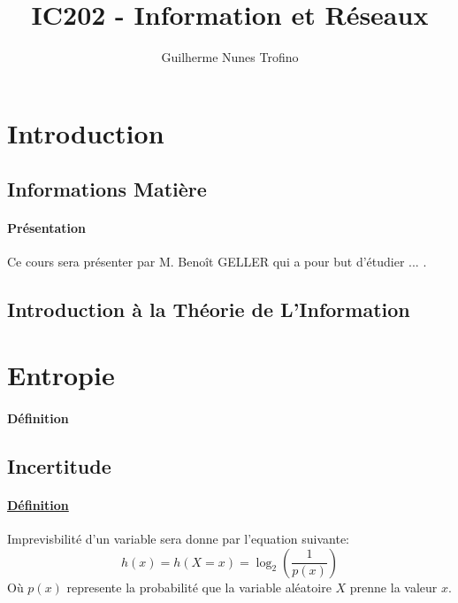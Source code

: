 \documentclass{article}
\title{IC202 - Information et Réseaux}
\author{Guilherme Nunes Trofino}
\begin{document}
\maketitle

\newpage\tableofcontents

\section{Introduction}

% 


\subsection{Informations Matière}
\paragraph{Présentation}Ce cours sera présenter par M. Benoît GELLER qui a pour but d'étudier ... .

\subsection{Introduction à la Théorie de L'Information}

\section{Entropie}
\paragraph{Définition}

\subsection{Incertitude}
\paragraph{\href{https://fr.wikipedia.org/wiki/Incertitude}{Définition}}Imprevisbilité d'un variable sera donne par l'equation suivante:
\begin{equation}\label{eq:incertitude}
    \boxed{
        h(x) = h(X=x) = \log_{2} \left(\frac{1}{p(x)}\right)
    }
\end{equation}
Où $p(x)$ represente la probabilité que la variable aléatoire $X$ prenne la valeur $x$.
\end{document}
